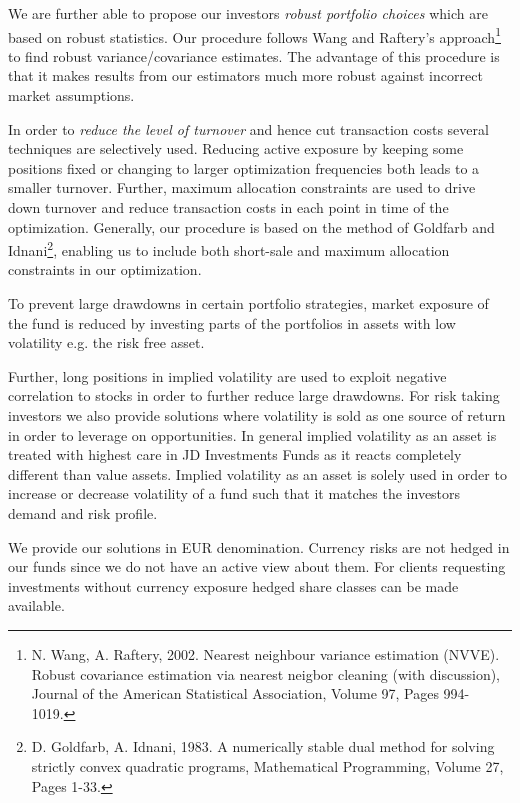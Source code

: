 \documentclass[11pt, parskip=full, DIV=14, headings=small, footsepline, footinclude=false, headsepline]{scrreprt}
\begin{document}
We are further able to propose our investors \textit{robust portfolio choices} which are based on robust statistics.
Our procedure follows Wang and Raftery’s approach\footnote{N. Wang, A. Raftery, 2002. Nearest neighbour variance estimation (NVVE). Robust covariance estimation via nearest neigbor cleaning (with discussion), Journal of the American Statistical Association, Volume 97, Pages 994-1019.} to find robust variance/covariance estimates.
The advantage of this procedure is that it makes results from our estimators much more robust against incorrect market assumptions.

In order to \textit{reduce the level of turnover} and hence cut transaction costs several techniques are selectively used.
Reducing active exposure by keeping some positions fixed or changing to larger optimization frequencies both leads to a smaller turnover.
Further, maximum allocation constraints are used to drive down turnover and reduce transaction costs in each point in time of the optimization.
Generally, our procedure is based on the method of Goldfarb and Idnani\footnote{D. Goldfarb, A. Idnani, 1983. A numerically stable dual method for solving strictly convex quadratic programs, Mathematical Programming, Volume 27, Pages 1-33.}, enabling us to include both short-sale and maximum allocation constraints in our optimization.

To prevent large drawdowns in certain portfolio strategies, market exposure of the fund is reduced by investing parts of the portfolios in assets with low volatility e.g. the risk free asset.

Further, long positions in implied volatility are used to exploit negative correlation to stocks in order to further reduce large drawdowns.
For risk taking investors we also provide solutions where volatility is sold as one source of return in order to leverage on opportunities.
In general implied volatility as an asset is treated with highest care in JD Investments Funds as it reacts completely different than value assets.
Implied volatility as an asset is solely used in order to increase or decrease volatility of a fund such that it matches the investors demand and risk profile.

We provide our solutions in EUR denomination.
Currency risks are not hedged in our funds since we do not have an active view about them.
For clients requesting investments without currency exposure hedged share classes can be made available.

\vspace{-5em}
\end{document}
